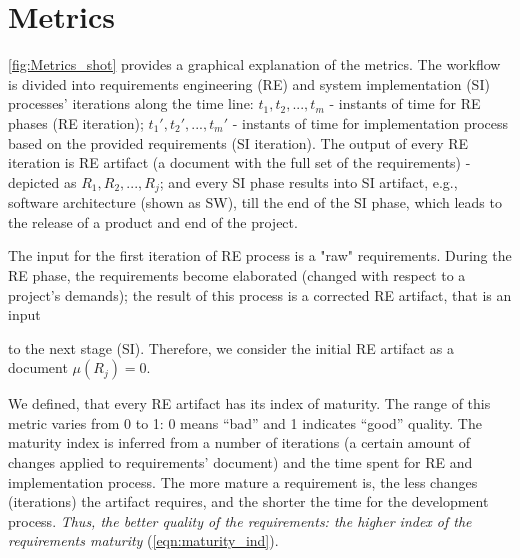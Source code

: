 \section{Metrics}
\label{sec:Solution} 

%

%
\autoref{fig:Metrics_shot} provides a graphical explanation of the metrics. The workflow is divided into requirements engineering (RE) 
and system implementation (SI) processes' iterations along the time line: $t_{1},t_{2},...,t_{m}$ - 
instants of time for RE phases (RE iteration); $t_{1}',t_{2}',...,t_{m}'$ - 
instants of time for implementation process based on the provided requirements (SI iteration).
The output of every RE iteration is RE artifact (a document with the full set of the requirements) - depicted as $R_{1},R_{2},...,R_{j}$; and every SI phase results into SI artifact, 
e.g., software architecture (shown as SW), till the end of the SI phase, which leads to the release of a product and end of the project. 

The input for the first iteration of RE process is a "raw" requirements. During the RE phase, the requirements become elaborated (changed with respect to a project's demands); the result of this process is a corrected RE artifact, that is an input 

\newpage
\hfill \break

\vspace{5.4cm}

to the next stage (SI). Therefore, we consider the initial RE artifact as a document \textit{$\mu(R_{j})=0$}. 
 

We defined, that every RE artifact has its index of maturity. The range of this metric varies from 0 to 1: 0 means ``bad'' and 1 indicates ``good'' quality.
The maturity index is inferred from a number of iterations (a certain amount of changes applied to requirements' document) and the time spent for RE and implementation process.
The more mature a requirement is, the less changes (iterations) the artifact requires, and the shorter the time for the development process. 
\textsl{Thus, the better quality of the requirements: the higher index of the requirements maturity} (\autoref{eqn:maturity_ind}). 

